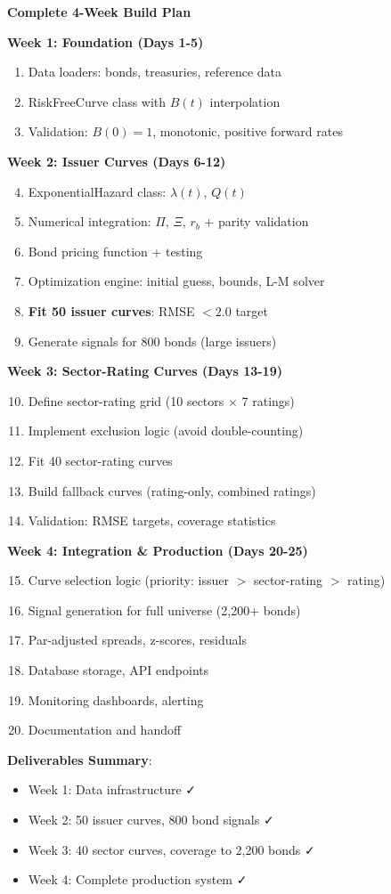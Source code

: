 \documentclass[11pt,a4paper]{article}
\begin{document}
\begin{implbox}
\textbf{Complete 4-Week Build Plan}

\textbf{Week 1: Foundation (Days 1-5)}
\begin{enumerate}
    \item Data loaders: bonds, treasuries, reference data
    \item RiskFreeCurve class with $B(t)$ interpolation
    \item Validation: $B(0)=1$, monotonic, positive forward rates
\end{enumerate}

\textbf{Week 2: Issuer Curves (Days 6-12)}
\begin{enumerate}
    \setcounter{enumi}{3}
    \item ExponentialHazard class: $\lambda(t)$, $Q(t)$
    \item Numerical integration: $\Pi$, $\Xi$, $r_b$ + parity validation
    \item Bond pricing function + testing
    \item Optimization engine: initial guess, bounds, L-M solver
    \item \textbf{Fit 50 issuer curves}: RMSE $< 2.0$ target
    \item Generate signals for 800 bonds (large issuers)
\end{enumerate}

\textbf{Week 3: Sector-Rating Curves (Days 13-19)}
\begin{enumerate}
    \setcounter{enumi}{9}
    \item Define sector-rating grid (10 sectors $\times$ 7 ratings)
    \item Implement exclusion logic (avoid double-counting)
    \item Fit 40 sector-rating curves
    \item Build fallback curves (rating-only, combined ratings)
    \item Validation: RMSE targets, coverage statistics
\end{enumerate}

\textbf{Week 4: Integration \& Production (Days 20-25)}
\begin{enumerate}
    \setcounter{enumi}{14}
    \item Curve selection logic (priority: issuer $>$ sector-rating $>$ rating)
    \item Signal generation for full universe (2,200+ bonds)
    \item Par-adjusted spreads, z-scores, residuals
    \item Database storage, API endpoints
    \item Monitoring dashboards, alerting
    \item Documentation and handoff
\end{enumerate}

\textbf{Deliverables Summary}:
\begin{itemize}
    \item Week 1: Data infrastructure ✓
    \item Week 2: 50 issuer curves, 800 bond signals ✓
    \item Week 3: 40 sector curves, coverage to 2,200 bonds ✓
    \item Week 4: Complete production system ✓
\end{itemize}
\end{implbox}
\end{document}

